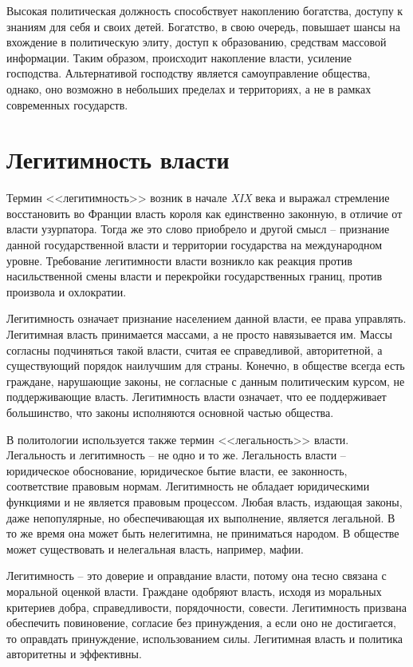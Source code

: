 Высокая политическая должность способствует накоплению богатства, доступу к
знаниям для себя и своих детей. Богатство, в свою очередь, повышает шансы на
вхождение в политическую элиту, доступ к образованию, средствам массовой
информации. Таким образом, происходит накопление власти, усиление господства.
Альтернативой господству является самоуправление общества, однако, оно возможно
в небольших пределах и территориях, а не в рамках современных государств.

\vspace*{2em}

\section{Легитимность власти}

Термин <<легитимность>> возник в начале \emph{XIX} века и выражал стремление
восстановить во Франции власть короля как единственно законную, в отличие от
власти узурпатора. Тогда же это слово приобрело и другой смысл -- признание
данной государственной власти и территории государства на международном уровне.
Требование легитимности власти возникло как реакция против насильственной смены
власти и перекройки государственных границ, против произвола и охлократии.

Легитимность означает признание населением данной власти, ее права управлять. 
Легитимная власть принимается массами, а не просто навязывается им. Массы
согласны подчиняться такой власти, считая ее справедливой, авторитетной, а
существующий порядок наилучшим для страны. Конечно, в обществе всегда есть
граждане, нарушающие законы, не согласные с данным политическим курсом, не
поддерживающие власть. Легитимность власти означает, что ее поддерживает
большинство, что законы исполняются основной частью общества.

В политологии используется также термин <<легальность>> власти. Легальность и
легитимность -- не одно и то же. Легальность власти -- юридическое обоснование,
юридическое бытие власти, ее законность, соответствие правовым нормам.
Легитимность не обладает юридическими функциями и не является правовым
процессом. Любая власть, издающая законы, даже непопулярные, но обеспечивающая
их выполнение, является легальной. В то же время она может быть нелегитимна, не
приниматься народом. В обществе может существовать и нелегальная власть,
например, мафии.

Легитимность -- это доверие и оправдание власти, потому она тесно связана с
моральной оценкой власти. Граждане одобряют власть, исходя из моральных
критериев добра, справедливости, порядочности, совести. Легитимность призвана
обеспечить повиновение, согласие без принуждения, а если оно не достигается, то
оправдать принуждение, использованием силы. Легитимная власть и политика
авторитетны и эффективны.

